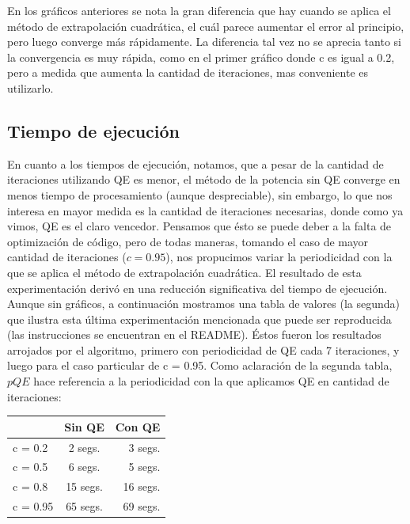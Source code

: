 En los gr\'aficos anteriores se nota la gran diferencia que hay cuando se aplica el m\'etodo de extrapolaci\'on cuadr\'atica, el cu\'al parece aumentar el error al principio, pero luego converge m\'as r\'apidamente. La diferencia tal vez no se aprecia tanto si la convergencia es muy r\'apida, como en el primer gr\'afico donde c es igual a 0.2, pero a medida que aumenta la cantidad de iteraciones, mas conveniente es utilizarlo.\\


\subsection{Tiempo de ejecuci\'on}

En cuanto a los tiempos de ejecuci\'on, notamos, que a pesar de la cantidad de iteraciones utilizando QE es menor, el m\'etodo de la potencia sin QE converge en menos tiempo de procesamiento (aunque despreciable), sin embargo, lo que nos interesa en mayor medida es la cantidad de iteraciones necesarias, donde como ya vimos, QE es el claro vencedor. Pensamos que \'esto se puede deber a la falta de optimizaci\'on de c\'odigo, pero de todas maneras, tomando el caso de mayor cantidad de iteraciones ($c = 0.95$), nos propucimos variar la periodicidad con la que se aplica el método de extrapolación cuadrática. El resultado de esta experimentación derivó en una reducción significativa del tiempo de ejecución. Aunque sin gráficos, a continuación mostramos una tabla de valores (la segunda) que ilustra esta última experimentación mencionada que puede ser reproducida (las instrucciones se encuentran en el README).
\'Estos fueron los resultados arrojados por el algoritmo, primero con periodicidad de QE cada 7 iteraciones, y luego para el caso particular de c = 0.95. Como aclaración de la segunda tabla, $pQE$ hace referencia a la periodicidad con la que aplicamos QE en cantidad de iteraciones: \\

\begin{tabular}{ l | c | r}
  & Sin QE & Con QE\\
  \hline
  c = 0.2 & 2 segs. & 3 segs.\\
  \hline
  c = 0.5 & 6 segs. & 5 segs.\\
  \hline
  c = 0.8 & 15 segs. & 16 segs. \\
  \hline
  c = 0.95 & 65 segs. & 69 segs. \\
  \hline
\end{tabular}

